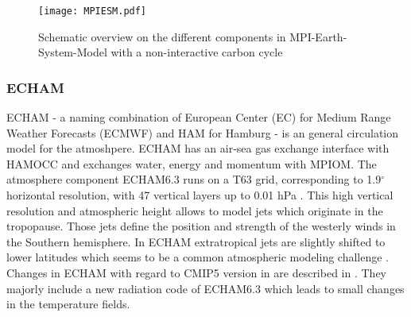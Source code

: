\documentclass[12pt]{article}
\begin{document}
\begin{figure}[h!]
	\centering 
	\texttt{[image: MPIESM.pdf]}
	\caption{Schematic overview on the different components in MPI-Earth-System-Model with a non-interactive carbon cycle \citep{Giorgetta2013}}
	\label{fig:MPIESM}
\end{figure}



\subsubsection{ECHAM}
ECHAM - a naming combination of European Center (EC) for Medium Range Weather Forecasts (ECMWF) and HAM for Hamburg -  is an general circulation model for the atmoshpere. ECHAM has an air-sea gas exchange interface with HAMOCC and exchanges water, energy and momentum with MPIOM. 
The atmosphere component ECHAM6.3 runs on a T63 grid, corresponding to 1.9$^\circ$ horizontal resolution, with 47 vertical layers up to 0.01 hPa \citep{Stevens2013}. 
This high vertical resolution and atmospheric height allows to model jets which originate in the tropopause. Those jets define the position and strength of the westerly winds in the Southern hemisphere.  In ECHAM extratropical jets are slightly shifted to lower latitudes \citep{Stevens2013} which seems to be a common atmospheric modeling challenge \citep{Kidston2010}.
Changes in ECHAM with regard to CMIP5 version in \cite{Stevens2013} are described in \cite{Bittner2016}. They majorly include a new radiation code of ECHAM6.3 which leads to small changes in the temperature fields.  
\end{document}
